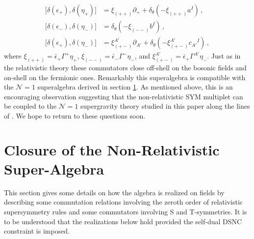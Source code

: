 \documentclass[a4paper,10pt,openany]{article}
\begin{document}
	\begin{subequations}
		\begin{align}
			\big[\delta(\epsilon_+),\delta(\eta_+)\big] &= \xi_{(++)}\partial_+ + \delta_\theta(-\xi_{(++)}a^I)\,,\\
			\big[\delta(\epsilon_-),\delta(\eta_-)\big] &=\delta_\theta(-\xi_{(--)}b^I)\,,\\
			\big[\delta(\epsilon_+),\delta(\eta_-)\big] &= \xi_{(+-)}^{A'}\partial_{A'} + \delta_\theta(-\xi_{(+-)}^{A'}c_{A'}{}^I)\,,
		\end{align}
	\end{subequations}
	where $\xi_{(++)}=\bar\epsilon_+\Gamma^+\eta_+$, $\xi_{(--)}=\bar\epsilon_-\Gamma^-\eta_-$, and $\xi^{A'}_{(+-)}=\bar\epsilon_+\Gamma^{A'}\eta_-$. Just as in the relativistic theory these commutators close off-shell on the bosonic fields and on-shell on the fermionic ones. Remarkably this superalgebra is compatible with the $\mathcal N=1$ superalgebra derived in section \ref{sec:algebra}. As mentioned above, this is an encouraging observation suggesting that the non-relativistic SYM multiplet can be coupled to the $\mathcal N=1$ supergravity theory studied in this paper along the lines of \cite{Bergshoeff:1981um}. We hope to return to these questions soon.
	
	
	
	\section{Closure of the Non-Relativistic Super-Algebra}\label{sec:algebra}
	This section gives some details on how the algebra is realized on fields by describing some commutation relations involving the zeroth order of relativistic supersymmetry rules and some commutators involving S and T-symmetries. It is to be understood that the realizations below hold provided the self-dual DSNC constraint is imposed.
\end{document}
